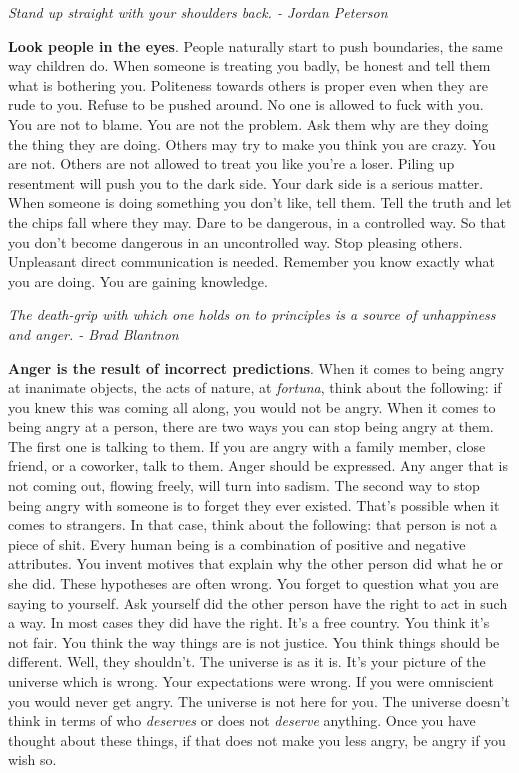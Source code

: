 \documentclass[a4paper,hidelinks]{article}
\begin{document}
\newpage

\begin{center}
\textit{Stand up straight with your shoulders back. - Jordan Peterson}
\end{center}

\textbf{Look people in the eyes}.
People naturally start to push boundaries, the same way children do.
When someone is treating you badly, be honest and tell them what is bothering you.
Politeness towards others is proper even when they are rude to you.
Refuse to be pushed around.
No one is allowed to fuck with you.
You are not to blame.
You are not the problem.
Ask them why are they doing the thing they are doing.
Others may try to make you think you are crazy.
You are not.
Others are not allowed to treat you like you're a loser.
Piling up resentment will push you to the dark side.
Your dark side is a serious matter.
When someone is doing something you don't like, tell them.
Tell the truth and let the chips fall where they may.
Dare to be dangerous, in a controlled way.
So that you don't become dangerous in an uncontrolled way.
Stop pleasing others.
Unpleasant direct communication is needed.
Remember you know exactly what you are doing.
You are gaining knowledge.

\newpage

\begin{center}
\textit{The death-grip with which one holds on to principles is a source of unhappiness and anger. - Brad Blantnon}
\end{center}

\textbf{Anger is the result of incorrect predictions}.
When it comes to being angry at inanimate objects, the acts of nature, at \textit{fortuna}, think about the following: if you knew this was coming all along, you would not be angry.
When it comes to being angry at a person, there are two ways you can stop being angry at them.
The first one is talking to them.
If you are angry with a family member, close friend, or a coworker, talk to them.
Anger should be expressed.
Any anger that is not coming out, flowing freely, will turn into sadism.
The second way to stop being angry with someone is to forget they ever existed.
That's possible when it comes to strangers.
In that case, think about the following: that person is not a piece of shit.
Every human being is a combination of positive and negative attributes.
You invent motives that explain why the other person did what he or she did.
These hypotheses are often wrong.
You forget to question what you are saying to yourself.
Ask yourself did the other person have the right to act in such a way.
In most cases they did have the right.
It's a free country.
You think it's not fair.
You think the way things are is not justice.
You think things should be different.
Well, they shouldn't.
The universe is as it is.
It's your picture of the universe which is wrong.
Your expectations were wrong.
If you were omniscient you would never get angry.
The universe is not here for you.
The universe doesn't think in terms of who \textit{deserves} or does not \textit{deserve} anything.
Once you have thought about these things, if that does not make you less angry, be angry if you wish so.
\end{document}
